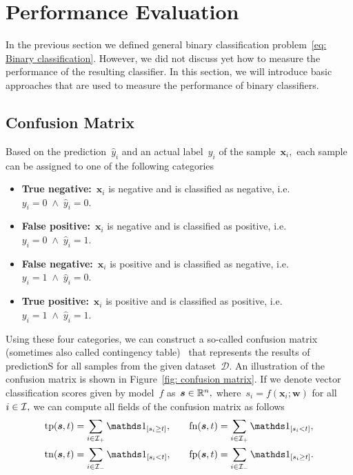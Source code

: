 
\section{Performance Evaluation}

In the previous section we defined general binary classification problem~\ref{eq: Binary classification}. However, we did not discuss yet how to measure the performance of the resulting classifier. In this section, we will introduce basic approaches that are used to measure the performance of binary classifiers.

\subsection{Confusion Matrix}
Based on the prediction~$\hat{y}_i$ and an actual label~$y_i$ of the sample~$\bm{x}_i,$ each sample can be assigned to one of the following categories
\begin{itemize}
  \item \textbf{True negative:}~$\bm{x}_i$ is negative and is classified as negative, i.e.~$y_i = 0 \; \land \; \hat{y}_i = 0.$
  \item \textbf{False positive:}~$\bm{x}_i$ is negative and is classified as positive, i.e.~$y_i = 0 \; \land \; \hat{y}_i = 1.$
  \item \textbf{False negative:}~$\bm{x}_i$ is positive and is classified as negative, i.e.~$y_i = 1 \; \land \; \hat{y}_i = 0.$
  \item \textbf{True positive:}~$\bm{x}_i$ is positive and is classified as positive, i.e.~$y_i = 1 \; \land \; \hat{y}_i = 1.$
\end{itemize}
Using these four categories, we can construct a so-called confusion matrix (sometimes also called contingency table)~\cite{fawcett2006introduction} that represents the results of predictionS for all samples from the given dataset~$\mathcal{D}$. An illustration of the confusion matrix is shown in Figure~\ref{fig: confusion matrix}. If we denote vector classification scores given by model~$f$ as~$\bm{s} \in \mathbb{R}^n,$ where~$s_i = f(\bm{x}_i; \bm{w})$ for all~$i \in \mathcal{I},$ we can compute all fields of the confusion matrix as follows
\begin{equation}\label{eq: confusion counts}
  \begin{aligned}
    \tp(\bm{s}, t) & = \sum_{i \in \Ipos}\Iverson{s_i \geq t}, & \quad
    \fn(\bm{s}, t) & = \sum_{i \in \Ipos}\Iverson{s_i < t}, \\
    \tn(\bm{s}, t) & = \sum_{i \in \Ineg}\Iverson{s_i < t}, & \quad
    \fp(\bm{s}, t) & = \sum_{i \in \Ineg}\Iverson{s_i \geq t}.
  \end{aligned}
\end{equation}

